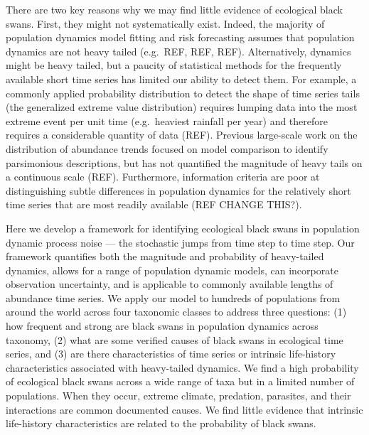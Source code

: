 There are two key reasons why we may find little evidence of ecological black
swans. First, they might not systematically exist. Indeed, the majority of
population dynamics model fitting and risk forecasting assumes that population
dynamics are not heavy tailed (e.g.~REF, REF, REF). Alternatively, dynamics
might be heavy tailed, but a paucity of statistical methods for the frequently
available short time series has limited our ability to detect them. For
example, a commonly applied probability distribution to detect the shape of
time series tails (the generalized extreme value distribution) requires lumping
data into the most extreme event per unit time (e.g.~heaviest rainfall per
year) and therefore requires a considerable quantity of data (REF). Previous
large-scale work on the distribution of abundance trends focused on model
comparison to identify parsimonious descriptions, but has not quantified the
magnitude of heavy tails on a continuous scale (REF). Furthermore, information
criteria are poor at distinguishing subtle differences in population dynamics
for the relatively short time series that are most readily available (REF
CHANGE THIS?).

Here we develop a framework for identifying ecological black swans in
population dynamic process noise --- the stochastic jumps from time step to
time step. Our framework quantifies both the magnitude and probability of
heavy-tailed dynamics, allows for a range of population dynamic models, can
incorporate observation uncertainty, and is applicable to commonly available
lengths of abundance time series. We apply our model to hundreds of populations
from around the world across four taxonomic classes to address three questions:
(1) how frequent and strong are black swans in population dynamics across
taxonomy, (2) what are some verified causes of black swans in ecological time
series, and (3) are there characteristics of time series or intrinsic
life-history characteristics associated with heavy-tailed dynamics. We find
a high probability of ecological black swans across a wide range of taxa but in
a limited number of populations. When they occur, extreme climate, predation,
parasites, and their interactions are common documented causes. We find little
evidence that intrinsic life-history characteristics are related to the
probability of black swans.


